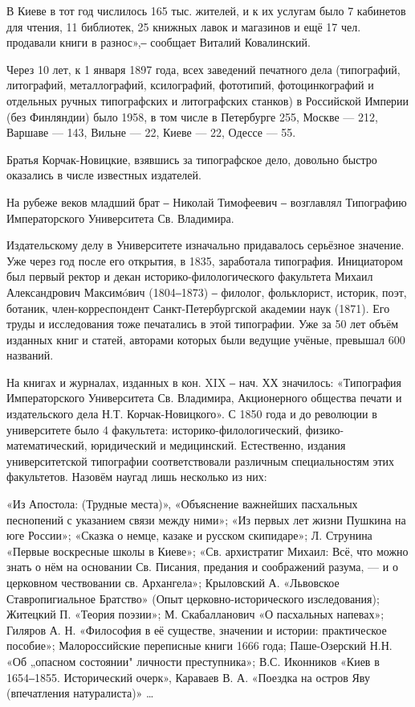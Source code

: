 В Киеве в тот год числилось 165 тыс. жителей, и к их услугам было 7 кабинетов
для чтения, 11 библиотек, 25 книжных лавок и магазинов и ещё 17 чел. продавали
книги в разнос»,‒ сообщает  Виталий Ковалинский.

Через 10 лет, к 1 января 1897 года, всех заведений печатного дела (типографий,
литографий, металлографий, ксилографий, фототипий, фотоцинкографий и отдельных
ручных типографских и литографских станков) в Российской Империи (без
Финляндии) было 1958, в том числе в Петербурге 255, Москве — 212, Варшаве —
143, Вильне — 22, Киеве — 22, Одессе — 55.

Братья Корчак-Новицкие, взявшись за типографское дело, довольно быстро
оказались в числе известных издателей.

На рубеже веков младший брат ‒ Николай Тимофеевич ‒ возглавлял Типографию
Императорского Университета Св. Владимира. 

Издательскому делу в Университете изначально придавалось серьёзное значение.
Уже через год после его открытия, в 1835, заработала типография. Инициатором
был первый ректор и декан историко-филологического факультета Михаил
Александрович Максимóвич (1804‒1873) ‒ филолог, фольклорист, историк, поэт,
ботаник, член-корреспондент Санкт-Петербургской академии наук (1871). Его труды
и исследования тоже печатались в этой типографии. Уже за 50 лет объём изданных
книг и статей, авторами которых были ведущие учёные, превышал 600 названий. 

На книгах и журналах, изданных в кон. XIX ‒ нач. ХХ значилось: «Типография
Императорского Университета Св. Владимира, Акционерного общества печати и
издательского дела Н.Т. Корчак-Новицкого». С 1850 года и до революции в
университете было 4 факультета: историко-филологический, физико-математический,
юридический и медицинский. Естественно, издания университетской типографии
соответствовали различным специальностям этих факультетов. Назовём наугад лишь
несколько из них:

«Из Апостола: (Трудные места)», «Объяснение важнейших пасхальных песнопений с
указанием связи между ними»; «Из первых лет жизни Пушкина на юге России»;
«Сказка о немце, казаке и русском скипидаре»; Л. Струнина «Первые воскресные
школы в Киеве»; «Св. архистратиг Михаил: Всё, что можно знать о нём на
основании Св. Писания, предания и соображений разума, — и о церковном
чествовании св. Архангела»; Крыловский А. «Львовское Ставропигиальное Братство»
(Опыт церковно-исторического изследования); Житецкий П. «Теория поэзии»; М.
Скабалланович «О пасхальных напевах»; Гиляров А. Н. «Философия в её существе,
значении и истории: практическое пособие»;  Малороссийские переписные книги
1666 года; Паше-Озерский Н.Н. «Об „опасном состоянии" личности преступника»;
В.С. Иконников «Киев в 1654‒1855. Исторический очерк», Караваев В. А. «Поездка
на остров Яву (впечатления натуралиста)» …

